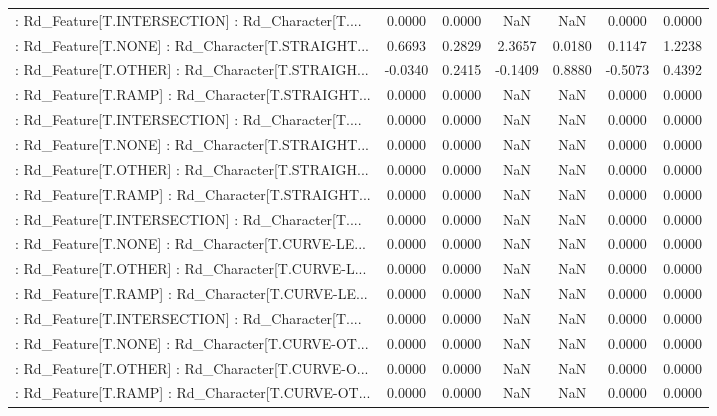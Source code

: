 \begin{longtable}{p{4cm}cccccc}
 : Rd\_Feature[T.INTERSECTION] : Rd\_Character[T.... &  0.0000 &    0.0000 &     NaN &          NaN &  0.0000 &  0.0000 \\
 : Rd\_Feature[T.NONE] : Rd\_Character[T.STRAIGHT... &  0.6693 &    0.2829 &  2.3657 &       0.0180 &  0.1147 &  1.2238 \\
 : Rd\_Feature[T.OTHER] : Rd\_Character[T.STRAIGH... & -0.0340 &    0.2415 & -0.1409 &       0.8880 & -0.5073 &  0.4392 \\
 : Rd\_Feature[T.RAMP] : Rd\_Character[T.STRAIGHT... &  0.0000 &    0.0000 &     NaN &          NaN &  0.0000 &  0.0000 \\
 : Rd\_Feature[T.INTERSECTION] : Rd\_Character[T.... &  0.0000 &    0.0000 &     NaN &          NaN &  0.0000 &  0.0000 \\
 : Rd\_Feature[T.NONE] : Rd\_Character[T.STRAIGHT... &  0.0000 &    0.0000 &     NaN &          NaN &  0.0000 &  0.0000 \\
 : Rd\_Feature[T.OTHER] : Rd\_Character[T.STRAIGH... &  0.0000 &    0.0000 &     NaN &          NaN &  0.0000 &  0.0000 \\
 : Rd\_Feature[T.RAMP] : Rd\_Character[T.STRAIGHT... &  0.0000 &    0.0000 &     NaN &          NaN &  0.0000 &  0.0000 \\
 : Rd\_Feature[T.INTERSECTION] : Rd\_Character[T.... &  0.0000 &    0.0000 &     NaN &          NaN &  0.0000 &  0.0000 \\
 : Rd\_Feature[T.NONE] : Rd\_Character[T.CURVE-LE... &  0.0000 &    0.0000 &     NaN &          NaN &  0.0000 &  0.0000 \\
 : Rd\_Feature[T.OTHER] : Rd\_Character[T.CURVE-L... &  0.0000 &    0.0000 &     NaN &          NaN &  0.0000 &  0.0000 \\
 : Rd\_Feature[T.RAMP] : Rd\_Character[T.CURVE-LE... &  0.0000 &    0.0000 &     NaN &          NaN &  0.0000 &  0.0000 \\
 : Rd\_Feature[T.INTERSECTION] : Rd\_Character[T.... &  0.0000 &    0.0000 &     NaN &          NaN &  0.0000 &  0.0000 \\
 : Rd\_Feature[T.NONE] : Rd\_Character[T.CURVE-OT... &  0.0000 &    0.0000 &     NaN &          NaN &  0.0000 &  0.0000 \\
 : Rd\_Feature[T.OTHER] : Rd\_Character[T.CURVE-O... &  0.0000 &    0.0000 &     NaN &          NaN &  0.0000 &  0.0000 \\
 : Rd\_Feature[T.RAMP] : Rd\_Character[T.CURVE-OT... &  0.0000 &    0.0000 &     NaN &          NaN &  0.0000 &  0.0000 \\

\end{longtable}
